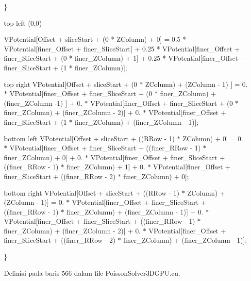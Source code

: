 \}

top left (0,0) \begin{DoxyVerb}    VPotential[Offset + sliceStart + (0 * ZColumn) + 0] =
        0.5 * VPotential[finer_Offset  + finer_SliceStart] +
        0.25 * VPotential[finer_Offset + finer_SliceStart + (0 * finer_ZColumn) + 1] +
        0.25 * VPotential[finer_Offset + finer_SliceStart + (1 * finer_ZColumn)];
\end{DoxyVerb}


top right V\+Potential\mbox{[}Offset + slice\+Start + (0 $\ast$ Z\+Column) + (Z\+Column -\/ 1) \mbox{]} = 0. $\ast$ V\+Potential\mbox{[}finer\+\_\+\+Offset + finer\+\_\+\+Slice\+Start + (0 $\ast$ finer\+\_\+\+Z\+Column) + (finer\+\_\+\+Z\+Column -\/1) \mbox{]} + 0. $\ast$ V\+Potential\mbox{[}finer\+\_\+\+Offset + finer\+\_\+\+Slice\+Start + (0 $\ast$ finer\+\_\+\+Z\+Column) + (finer\+\_\+\+Z\+Column -\/ 2)\mbox{]} + 0. $\ast$ V\+Potential\mbox{[}finer\+\_\+\+Offset + finer\+\_\+\+Slice\+Start + (1 $\ast$ finer\+\_\+\+Z\+Column) + (finer\+\_\+\+Z\+Column -\/ 1)\mbox{]};

bottom left V\+Potential\mbox{[}Offset + slice\+Start + ((R\+Row -\/ 1) $\ast$ Z\+Column) + 0\mbox{]} = 0. $\ast$ V\+Potential\mbox{[}finer\+\_\+\+Offset + finer\+\_\+\+Slice\+Start + ((finer\+\_\+\+R\+Row -\/ 1) $\ast$ finer\+\_\+\+Z\+Column) + 0\mbox{]} + 0. $\ast$ V\+Potential\mbox{[}finer\+\_\+\+Offset + finer\+\_\+\+Slice\+Start + ((finer\+\_\+\+R\+Row -\/ 1) $\ast$ finer\+\_\+\+Z\+Column) + 1\mbox{]} + 0. $\ast$ V\+Potential\mbox{[}finer\+\_\+\+Offset + finer\+\_\+\+Slice\+Start + ((finer\+\_\+\+R\+Row -\/ 2) $\ast$ finer\+\_\+\+Z\+Column) + 0\mbox{]};

bottom right V\+Potential\mbox{[}Offset + slice\+Start + ((R\+Row -\/ 1) $\ast$ Z\+Column) + (Z\+Column -\/ 1)\mbox{]} = 0. $\ast$ V\+Potential\mbox{[}finer\+\_\+\+Offset + finer\+\_\+\+Slice\+Start + ((finer\+\_\+\+R\+Row -\/ 1) $\ast$ finer\+\_\+\+Z\+Column) + (finer\+\_\+\+Z\+Column -\/ 1)\mbox{]} + 0. $\ast$ V\+Potential\mbox{[}finer\+\_\+\+Offset + finer\+\_\+\+Slice\+Start + ((finer\+\_\+\+R\+Row -\/ 1) $\ast$ finer\+\_\+\+Z\+Column) + (finer\+\_\+\+Z\+Column -\/ 2)\mbox{]} + 0. $\ast$ V\+Potential\mbox{[}finer\+\_\+\+Offset + finer\+\_\+\+Slice\+Start + ((finer\+\_\+\+R\+Row -\/ 2) $\ast$ finer\+\_\+\+Z\+Column) + (finer\+\_\+\+Z\+Column -\/ 1)\mbox{]};

\}

Definisi pada baris 566 dalam file Poisson\+Solver3\+D\+G\+P\+U.\+cu.


